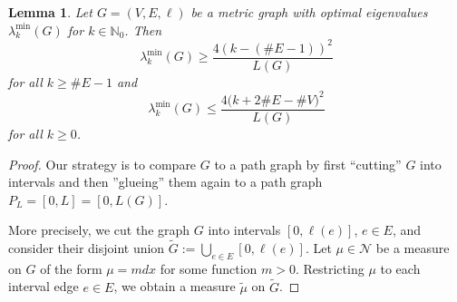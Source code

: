 \documentclass[reqno]{amsart}
\theoremstyle{plain}
\newtheorem{lem}[thm]{Lemma}
\theoremstyle{definition}
\theoremstyle{remark}
\numberwithin{equation}{section}
\newcommand{\N}{\mathbb{N}}     %
\newcommand{\cN}{\mathcal{N}}
\begin{document}
\begin{lem} \label{lem:EigenvalueInterlacingConsequence}
	Let $G=(V,E, \ell)$ be a metric graph with optimal eigenvalues $\lambda_k^{\min}(G)$ for $k \in \N_{0}$. Then
	\begin{equation*} \label{eq:EigenvalueInterlacingConsequence1}
		\lambda_k^{\min}(G) \ge 	\frac{4 (k-(\#E - 1))^2}{L(G)}
	\end{equation*}
	for all $k \ge \#E-1$  and 
	\begin{equation*} \label{eq:EigenvalueInterlacingConsequence2}
		\lambda_k^{\min}(G) \le \frac{4 \big(k + 2\#E - \#V  \big)^2}{L(G)}
	\end{equation*}
	for all $k \ge 0$.
\end{lem}
\begin{proof}
	Our strategy is to compare $G$ to a path graph by first ``cutting'' $G$ into intervals and then ''glueing'' them again to a path graph $P_L = [0, L] = [0,L(G)]$.
	
	
	More precisely, we cut the graph $G$ into intervals $[0, \ell(e)]$, $e\in E$, and consider their disjoint union $\widetilde G := \bigcup_{e \in E} [0, \ell(e)]$. Let $\mu \in \cN$ be a measure on $G$ of the form $\mu = m dx$ for some function $m >0$. Restricting $\mu$ to each interval edge $e \in E$, we obtain a measure $\widetilde \mu$ on $\widetilde G$.
	

\end{proof}
\end{document}
